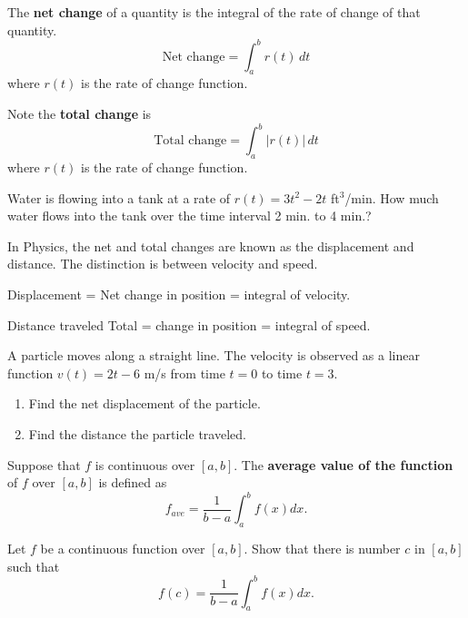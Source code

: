 \begin{definition}

The \textbf{net change} of a quantity is the integral of the rate of
change of that quantity. \[\text{Net change}=\int_a^b r(t)\,dt\] where
\(r(t)\) is the rate of change function.

Note the \textbf{total change} is
\[\text{Total change}=\int_a^b |r(t)|\,dt\] where \(r(t)\) is the rate of
change function.

\end{definition}

\begin{example}

Water is flowing into a tank at a rate of \(r(t)=3t^2-2t\) ft\(^3\)/min.
How much water flows into the tank over the time interval 2 min. to 4
min.?

In Physics, the net and total changes are known as the displacement and
distance. The distinction is between velocity and speed.

Displacement = Net change in position = integral of velocity.

Distance traveled Total = change in position = integral of speed.

\end{example}
\vspace*{6\baselineskip}

\begin{example}

A particle moves along a straight line. The velocity is observed as a
linear function \(v(t)=2t-6\) m/s from time \(t=0\) to time \(t=3\).

\begin{enumerate}
\item
  Find the net displacement of the particle.
\item
  Find the distance the particle traveled.
\end{enumerate}

\end{example}

\begin{definition}

Suppose that \(f\) is continuous over \([a,b]\). The \textbf{average
value of the function} of \(f\) over \([a, b]\) is defined as
\[f_{ave}=\dfrac{1}{b-a}\int_a^bf(x)dx.\]

\end{definition}

\begin{example}

Let \(f\) be a continuous function over \([a, b]\). Show that there is
number \(c\) in \([a,b]\) such that
\[f(c)=\dfrac{1}{b-a}\int_a^bf(x)dx.\]

\end{example}
\vspace*{6\baselineskip}

